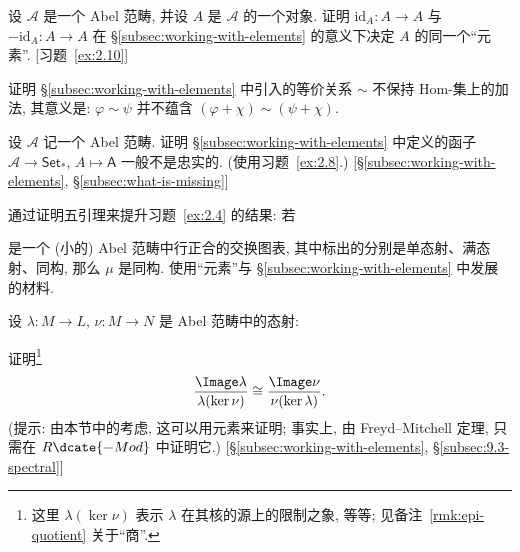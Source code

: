 \begin{prob}\label{ex:2.8}
设 $\mathcal{A}$ 是一个 Abel 范畴, 并设 $A$ 是 $\mathcal{A}$ 的一个对象. 证明 $\mathrm{id}_A:A\to A$ 与 $-\mathrm{id}_A:A\to A$ 在 \S\ref{subsec:working-with-elements} 的意义下决定 $A$ 的同一个``元素''. [习题~\ref{ex:2.10}]
\end{prob}

\begin{prob}\label{ex:2.9}
证明 \S\ref{subsec:working-with-elements} 中引入的等价关系 $\sim$ 不保持 Hom-集上的加法, 其意义是: $\varphi\sim\psi$ 并不蕴含 $(\varphi+\chi)\sim(\psi+\chi)$.
\end{prob}

\begin{prob}\label{ex:2.10}
设 $\mathcal{A}$ 记一个 Abel 范畴. 证明 \S\ref{subsec:working-with-elements} 中定义的函子 $\mathcal{A}\to\mathsf{Set}_*$, $A\mapsto\mathsf{A}$ 一般不是忠实的. (使用习题~\ref{ex:2.8}.) [\S\ref{subsec:working-with-elements}, \S\ref{subsec:what-is-missing}]
\end{prob}

\begin{prob}\label{ex:2.11}
通过证明五引理来提升习题~\ref{ex:2.4} 的结果: 若
\begin{center}
\end{center}
是一个 (小的) Abel 范畴中行正合的交换图表, 其中标出的分别是单态射、满态射、同构, 那么 $\mu$ 是同构. 使用``元素''与 \S\ref{subsec:working-with-elements} 中发展的材料.
\end{prob}

\begin{prob}\label{ex:2.12}
设 $\lambda:M\to L$, $\nu:M\to N$ 是 Abel 范畴中的态射:
\begin{center}
\end{center}
证明\footnote{这里 $\lambda(\ker\nu)$ 表示 $\lambda$ 在其核的源上的限制之象, 等等; 见备注~\ref{rmk:epi-quotient} 关于``商''.}
\[
\frac{\Image\lambda}{\lambda(\ker\nu)}\cong\frac{\Image\nu}{\nu(\ker\lambda)}.
\]
(提示: 由本节中的考虑, 这可以用元素来证明; 事实上, 由 Freyd–Mitchell 定理, 只需在 $R\dcate{-Mod}$ 中证明它.) [\S\ref{subsec:working-with-elements}, \S\ref{subsec:9.3-spectral}]
\end{prob}

